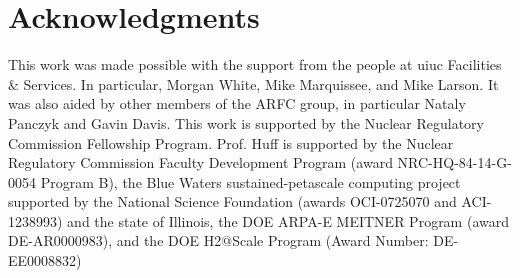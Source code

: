 \section{Acknowledgments}
This work was made possible with the support from the people at \gls{uiuc}
Facilities \& Services. In particular, Morgan White, Mike Marquissee, and Mike
Larson. It was also aided by other members of the \gls{ARFC} group, in
particular Nataly Panczyk and Gavin Davis.
This work is supported by the Nuclear Regulatory Commission Fellowship Program.
Prof. Huff is supported by the Nuclear Regulatory Commission Faculty
Development Program (award NRC-HQ-84-14-G-0054 Program B), the Blue Waters
sustained-petascale computing project supported by the National Science
Foundation (awards OCI-0725070 and ACI-1238993) and the state of Illinois, the
DOE ARPA-E MEITNER Program (award DE-AR0000983), and the DOE H2@Scale Program
(Award Number: DE-EE0008832)

